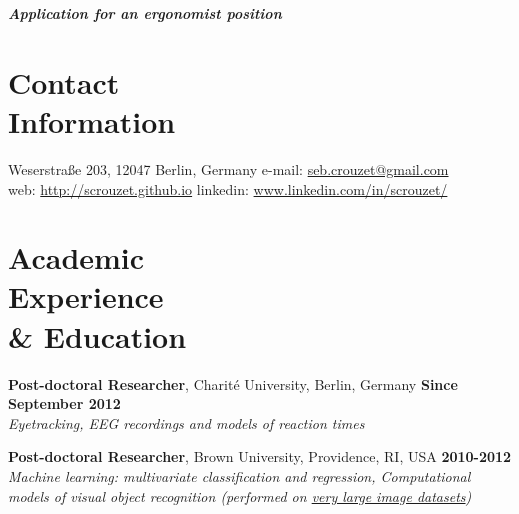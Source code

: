 \documentclass[margin,line]{resume}
\begin{document}

\begin{resume}

    \hfill \textbf{ \textsl{ \large Application for an ergonomist position}}
    
    \vspace{3mm}
    \section{\mysidestyle Contact\\Information}
    Weserstraße 203, 12047 Berlin, Germany            \hfill e-mail: \href{mailto:seb.crouzet@gmail.com}{seb.crouzet@gmail.com} \\
    web: \url{http://scrouzet.github.io} \hfill linkedin: \url{www.linkedin.com/in/scrouzet/}

    \vspace{3mm}
    \section{\mysidestyle  Academic \\ Experience\\ \& Education  }
    
         \textbf{Post-doctoral Researcher}, Charité University, Berlin, Germany \hfill \textbf{Since September 2012}\\
	\textsl{Eyetracking, EEG recordings and models of reaction times}
  	
	\vspace{-1.5mm}		
	\textbf{Post-doctoral Researcher}, Brown University, Providence, RI, USA \hfill \textbf{2010-2012}\\
	\textsl{Machine learning: multivariate classification and regression, Computational models of visual object recognition (performed on \href{http://www.image-net.org}{very large image datasets})}


\end{resume}
\end{document}
